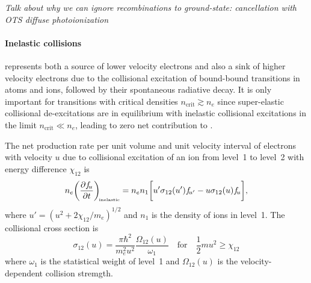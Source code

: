 \documentclass{emulateapj}
\begin{document}
\textit{Talk about why we can ignore recombinations to ground-state:
  cancellation with OTS diffuse photoionization}

\paragraph{Inelastic collisions}  represents both a
source of lower velocity electrons and also a sink of higher velocity
electrons due to the collisional excitation of bound-bound transitions
in atoms and ions, followed by their spontaneous radiative decay.  It
is only important for transitions with critical densities
\(n_{\mathrm{crit}} \gtrsim n_e\)
since super-elastic collisional de-excitations are in equilibrium with
inelastic collisional excitations in the limit
\(n_{\mathrm{crit}} \ll n_e\),
leading to zero net contribution to .  

The net production rate per unit volume and unit velocity interval of
electrons with velocity \(u\)
due to collisional excitation of an ion from level~1 to level~2 with
energy difference \(\chi_{12}\) is
\begin{equation}
  \label{eq:13}
  n_e \biggl( \frac{\partial f_{\!u}}{\partial t} \biggr)_{\!\scriptscriptstyle\mathrm{inelastic}} = n_e n_1 
  \biggl[u' \sigma_{12}(u') f_{\!u'} - u \sigma_{12}(u) f_{\!u}\biggr], 
\end{equation}
where \(u' = (u^2 + 2 \chi_{12}/m_e)^{1/2}\) and \(n_1\) is
the density of ions in level~1. The collisional cross section is
\begin{equation}
  \label{eq:16}
  \sigma_{12}(u) =
  \frac{\pi \hbar^2}{m_e^2 u^2} \frac{\Omega_{12}(u)}{\omega_1}
  \quad\mathrm{for}\quad
  \textstyle\frac12 m u^2 \ge \chi_{12} 
\end{equation}
where \(\omega_1\) is the statistical weight of level~1 and
\(\Omega_{12}(u)\) is the velocity-dependent collision stremgth.  
\end{document}
